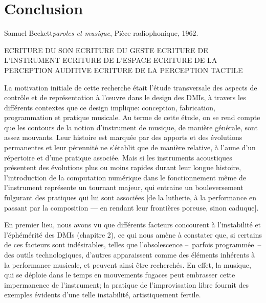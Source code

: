 %
\chapter{Conclusion}
\label{ch:conclusion}

{Samuel Beckett}{\textit{paroles et musique}, Pièce radiophonique, 1962. \cite{beckett_comeet_2014}}

ECRITURE DU SON
ECRITURE DU GESTE
ECRITURE DE L'INSTRUMENT
ECRITURE DE L'ESPACE
ECRITURE DE LA PERCEPTION AUDITIVE
ECRITURE DE LA PERCEPTION TACTILE

\noindent La motivation initiale de cette recherche était l'étude transversale des aspects de contrôle et de représentation à l'œuvre dans le design des \glspl{DMI}, à travers les différents contextes que ce design implique: conception, fabrication, programmation et pratique musicale. Au terme de cette étude, on se rend compte que les contours de la notion d'instrument de musique, de manière générale, sont assez mouvants. Leur histoire est marquée par des apports et des évolutions permanentes et leur pérennité ne s'établit que de manière relative, à l'aune d'un répertoire et d'une pratique associée. Mais si les instruments acoustiques présentent des évolutions plus ou moins rapides durant leur longue histoire, l'introduction de la computation numérique dans le fonctionnement même de l'instrument représente un tournant majeur, qui entraine un bouleversement fulgurant des pratiques qui lui sont associées [de la lutherie, à la performance en passant par la composition — en rendant leur frontières poreuse, sinon caduque].

\noindent En premier lieu, nous avons vu que différents facteurs concourent à l'instabilité et l'éphémérité des \glspl{DMI} (chapitre 2), ce qui nous amène à constater que, si certains de ces facteurs sont indésirables, telles que l'obsolescence --~parfois programmée~-- des outils technologiques, d'autres apparaissent comme des éléments inhérents à la performance musicale, et peuvent ainsi être recherchés. En effet, la musique, qui se déploie dans le temps en mouvements fugaces peut embrasser cette impermanence de l'instrument; la pratique de l'improvisation libre fournit des exemples évidents d'une telle instabilité, artistiquement fertile.


